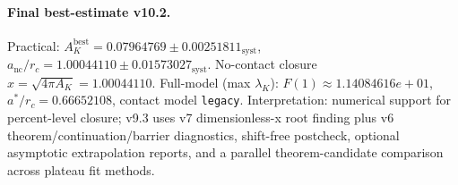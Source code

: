 \paragraph{Final best-estimate v10.2.}
Practical: $A_K^{\mathrm{best}} = 0.07964769 \pm 0.00251811_{\mathrm{syst}}$, $a_{\mathrm{nc}}/r_c = 1.00044110 \pm 0.01573027_{\mathrm{syst}}$.
No-contact closure $x = \sqrt{4\pi A_K} = 1.00044110$.
Full-model (max $\lambda_K$): $F(1) \approx 1.14084616e+01$, $a^*/r_c = 0.66652108$, contact model \texttt{legacy}.
Interpretation: numerical support for percent-level closure; v9.3 uses v7 dimensionless-x root finding plus v6 theorem/continuation/barrier diagnostics, shift-free postcheck, optional asymptotic extrapolation reports, and a parallel theorem-candidate comparison across plateau fit methods.
